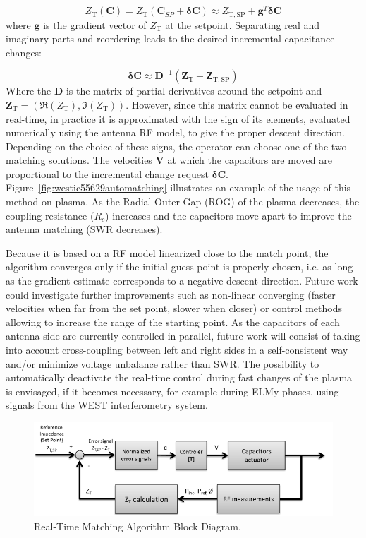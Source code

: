 \documentclass[12p]{iopart}
\newcommand{\ZT}{Z_{\mathrm{T}}}
\newcommand{\ZTSP}{Z_{\mathrm{T,SP}}}
\begin{document}
\begin{equation}
	\ZT (\mathbf{C}) = \ZT (\mathbf{C}_{SP} +  \mathbf{\delta C})\approx \ZTSP + \mathbf{g}^T  \mathbf{\delta C}
\end{equation}
where $\mathbf{g}$ is the gradient vector of $\ZT$ at the setpoint. Separating real and imaginary parts and reordering leads to the desired incremental capacitance changes:

\begin{equation}
	\mathbf{\delta C} \approx \mathbf{D}^{-1} (\mathbf{\ZT} - \mathbf{\ZTSP})
\end{equation}
Where the $\mathbf{D}$ is the matrix of partial derivatives around the setpoint and $\mathbf{\ZT}=(\Re(\ZT), \Im(\ZT))$. However, since this matrix cannot be evaluated in real-time, in practice it is approximated with the sign of its elements, evaluated numerically using the antenna RF model, to give the proper descent direction. Depending on the choice of these signs, the operator can choose one of the two matching solutions. The velocities $\mathbf{V}$ at which the capacitors are moved are proportional to the incremental change request $\mathbf{\delta C}$. Figure~\ref{fig:westic55629automatching} illustrates an example of the usage of this method on plasma. As the Radial Outer Gap (ROG) of the plasma decreases, the coupling resistance ($R_c$) increases and the capacitors move apart to improve the antenna matching (SWR decreases).

Because it is based on a RF model linearized close to the match point, the algorithm converges only if the initial guess point is properly chosen, i.e. as long as the gradient estimate corresponds to a negative descent direction. Future work could investigate further improvements such as non-linear converging (faster velocities when far from the set point, slower when closer)\cite{durodie2017} or control methods allowing to increase the range of the starting point. As the capacitors of each antenna side are currently controlled in parallel, future work will consist of taking into account cross-coupling between left and right sides in a self-consistent way and/or minimize voltage unbalance rather than SWR. The possibility to automatically deactivate the real-time control during fast changes of the plasma is envisaged, if it becomes necessary, for example during ELMy phases, using signals from the WEST interferometry system.

\begin{figure}
	\centering
	\includegraphics[width=0.95\linewidth]{figures/ICRH_matching_blobk_diagram}
	\caption{Real-Time Matching Algorithm Block Diagram.}
	\label{fig:icrhmatchingblobkdiagram}
\end{figure}
\end{document}
